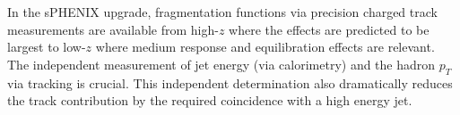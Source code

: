 
In the sPHENIX upgrade, fragmentation functions via precision charged
track measurements are available from high-$z$ where the effects are
predicted to be largest to low-$z$ where medium response and
equilibration effects are relevant.  The independent measurement of
jet energy (via calorimetry) and the hadron $p_T$ via tracking is
crucial.  This independent determination also dramatically reduces the
\fake track contribution by the required coincidence with a high
energy jet.



